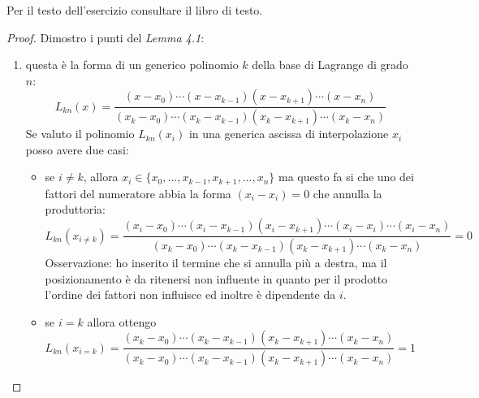 \begin{exercise}[4.3] 
Per il testo dell'esercizio consultare il libro di testo.
\end{exercise}
\begin{proof}
Dimostro i punti del \emph{Lemma 4.1}:
\begin{enumerate}
  \item \label{exercise43proofPoint1} questa \`e la forma di un generico
  polinomio $k$ della base di Lagrange di grado $n$:
  \begin{displaymath}
  L_{kn}(x) = \frac{(x-x_{0}) \cdots (x-x_{k-1})(x-x_{k+1})\cdots (x-x_{n})}
  	{(x_{k}-x_{0}) \cdots (x_{k}-x_{k-1})(x_{k}-x_{k+1})\cdots (x_{k}-x_{n})}
  \end{displaymath}
  Se valuto il polinomio $L_{kn}(x_{i})$ in una generica ascissa di
  interpolazione $x_{i}$ posso avere due casi:
  \begin{itemize}
    \item se $i \not = k$, allora $x_{i} \in \{
    x_{0},\ldots,x_{k-1},x_{k+1},\ldots,x_{n} \}$ ma questo fa si che uno dei
    fattori del numeratore abbia la forma $(x_{i} - x_{i}) = 0$ che annulla la
    produttoria:
    \begin{displaymath}
  L_{kn}(x_{i\not = k}) = \frac{(x_{i}-x_{0}) \cdots
  (x_{i}-x_{k-1})(x_{i}-x_{k+1})\cdots (x_{i}-x_{i}) \cdots (x_{i}-x_{n})}
  	{(x_{k}-x_{0}) \cdots (x_{k}-x_{k-1})(x_{k}-x_{k+1})\cdots (x_{k}-x_{n})} = 0
  \end{displaymath}
  Osservazione: ho inserito il termine che si annulla pi\`u a destra, ma il
  posizionamento \`e da ritenersi non influente in quanto per il prodotto
  l'ordine dei fattori non influisce ed inoltre \`e dipendente da $i$.
    \item se $i = k$ allora ottengo
    \begin{displaymath}
  L_{kn}(x_{i = k}) = \frac{(x_{k}-x_{0}) \cdots
  (x_{k}-x_{k-1})(x_{k}-x_{k+1})\cdots (x_{k}-x_{n})}
  	{(x_{k}-x_{0}) \cdots (x_{k}-x_{k-1})(x_{k}-x_{k+1})\cdots (x_{k}-x_{n})} = 1
  \end{displaymath}
  \end{itemize}
  

\end{enumerate}
\end{proof}
